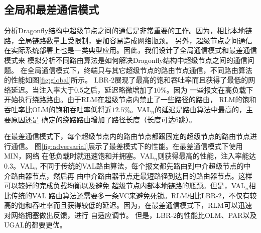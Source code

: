 \subsection{全局和最差通信模式}


分析Dragonfly结构中超级节点之间的通信是非常重要的工作。因为，相比本地链路，全局链路数量上受限制，更加容易造成网络瓶颈。
另外，超级节点之间通信在实际系统部署上也是一类典型应用。因此，我们设计了全局通信模式和最差通信模式来
模拟分析不同路由算法是如何解决Dragonfly结构中超级节点之间的通信问题。
在全局通信模式下，终端只与其它超级节点的路由节点通信，不同路由算法的性能如图\ref{fig:global}所示。
LBR-2展现了最高的饱和吞吐率而且获得了最低的网络延迟。当注入率大于0.5之后，延迟略微增加了$10\%$。因为
一些报文在高负载下开始执行绕路路由。由于RLM在超级节点内禁止了一些路径的路由，
RLM的饱和吞吐率比OLM的饱和吞吐率低将近$12.5\%$。VAL$_n$的延迟是路由算法中最高的，主要原因还是
确定的绕路路由增加了路径长度（长度可达6跳）。


\begin{figure*}[htbp]
  \centering
  \begin{minipage}[t]{\textwidth}
  \centering
  \caption{全局通信模式}
  \label{fig:global}
  \end{minipage}
\end{figure*}

在最差通信模式下，每个超级节点内的路由节点都跟固定的超级节点的路由节点进行通信。
图\ref{fig:adversarial}展示了最差模式下的性能。在最差通信模式下使用MIN，网络
在低负载时就迅速饱和并拥塞。VAL$_n$则获得最高的性能，注入率能达0.3。VAL$_n$
不同于传统的VAL路由算法，每个报文都先路由到中介超级节点的中介路由器节点，然后再
由中介路由器节点走最短路径到达目的路由器节点。这样可以较好的完成负载均衡以及避免
超级节点内部本地链路的瓶颈。但是，VAL$_n$相比传统的VAL
路由算法还需要多一条VC来避免死锁。RLM相比LBR-2，不仅有较高的饱和吞吐率而且获得较低的延迟。因为，在最差通信模式下，RLM可以迅速对网络拥塞做出反馈，进行
自适应调节。
但是，LBR-2的性能比OLM、PAR以及UGAL的都要更优。


\begin{figure*}[htbp]
  \centering
   \begin{minipage}[t]{\textwidth}
  \centering
  \caption{最差通信模式}
  \label{fig:adversarial}
  \end{minipage}
  \end{figure*}


